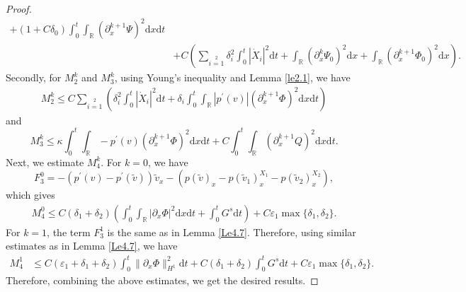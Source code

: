 \documentclass[10pt,reqno]{amsart}
\numberwithin{equation}{section}
\newcommand{\dif}{\mathrm{d}}
\begin{document}
\begin{proof}
\begin{align*}
+(1+C\delta_0)\int_0^t\int_\mathbb{R}\left(\partial_{x}^{k+1}\Psi\right)^2\dif x \dif t\\
&+C\left(\sum\limits_{i=1}\limits^2\delta_i^2\int_0^t|\dot{X}_i|^2\dif t
+\int_\mathbb{R}\left(\partial_{x}^k\Psi_0\right)^2\dif x
+\int_\mathbb{R}\left(\partial_{x}^{k+1}\Phi_0\right)^2\dif x\right).
\end{align*}
Secondly, for $M_2^k$ and $M_3^k$, using Young's inequality and Lemma \ref{le2.1}, we have
\begin{align*}
M_2^k\le  C\sum\limits_{i=1}\limits^2\left(\delta_i^2\int_0^t|\dot{X}_i|^2\dif t
+\delta_i\int_0^t\int_\mathbb{R}|p^\prime(v)|(\partial_{x}^{k+1}\Phi)^2 \dif x\dif t\right)
\end{align*}
and
\[
M_3^k\le
 \kappa\int_0^t\int_{\mathbb{R}}-p^{\prime}(v)\left(\partial_{x}^{k+1}\Phi\right)^2\dif x \dif t
   +C\int_0^t\int_\mathbb{R}\left(\partial_{x}^{k+1}Q\right)^2\dif x \dif t.
\]
Next, we estimate $M_4^k$. For $k=0$,  we have
\[
F_3^0=-(p^{\prime}(v)-p^{\prime}(\widetilde{v}))\widetilde{v}_{x}
-\left(p(\widetilde{v})_x-p(\widetilde{v}_1)^{X_1}_x-p(\widetilde{v}_2)^{X_2}_x\right),
\]
which gives
\begin{align*}
M_4^0\le C(\delta_1+\delta_2)\left(\int_0^t\int_\mathbb{R}|\partial_{x}\Phi|^2\dif x\dif t
  +\int_0^tG^s\dif t\right)
  +C\varepsilon_1\max\{\delta_1,\delta_2\}.
\end{align*}
For $k=1$, the term $F_3^1$ is the same as in Lemma \ref{Le4.7}. Therefore, using similar estimates as in Lemma \ref{Le4.7}, we have
\begin{align*}
M_4^1&\le C(\varepsilon_1+\delta_1+\delta_2)
\int_0^t\|\partial_{x}\Phi\|_{H^1}^2\dif t
 +C(\delta_1+\delta_2)\int_0^tG^s\dif t
  +C\varepsilon_1\max\{\delta_1,\delta_2\}.
\end{align*}
Therefore, combining the above estimates, we get the desired results.
\end{proof}
\end{document}
